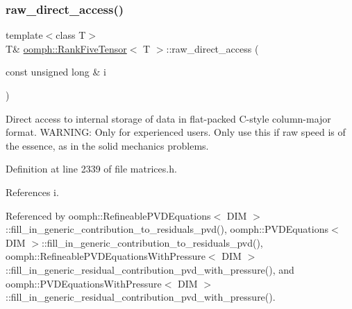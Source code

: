 \subsubsection{\texorpdfstring{raw\+\_\+direct\+\_\+access()}{raw\_direct\_access()}\hspace{0.1cm}{\footnotesize\ttfamily [1/2]}}
{\footnotesize\ttfamily template$<$class T$>$ \\
T\& \hyperlink{classoomph_1_1RankFiveTensor}{oomph\+::\+Rank\+Five\+Tensor}$<$ T $>$\+::raw\+\_\+direct\+\_\+access (\begin{DoxyParamCaption}\item[{const unsigned long \&}]{i }\end{DoxyParamCaption})\hspace{0.3cm}{\ttfamily [inline]}}



Direct access to internal storage of data in flat-\/packed C-\/style column-\/major format. W\+A\+R\+N\+I\+NG\+: Only for experienced users. Only use this if raw speed is of the essence, as in the solid mechanics problems. 



Definition at line 2339 of file matrices.\+h.



References i.



Referenced by oomph\+::\+Refineable\+P\+V\+D\+Equations$<$ D\+I\+M $>$\+::fill\+\_\+in\+\_\+generic\+\_\+contribution\+\_\+to\+\_\+residuals\+\_\+pvd(), oomph\+::\+P\+V\+D\+Equations$<$ D\+I\+M $>$\+::fill\+\_\+in\+\_\+generic\+\_\+contribution\+\_\+to\+\_\+residuals\+\_\+pvd(), oomph\+::\+Refineable\+P\+V\+D\+Equations\+With\+Pressure$<$ D\+I\+M $>$\+::fill\+\_\+in\+\_\+generic\+\_\+residual\+\_\+contribution\+\_\+pvd\+\_\+with\+\_\+pressure(), and oomph\+::\+P\+V\+D\+Equations\+With\+Pressure$<$ D\+I\+M $>$\+::fill\+\_\+in\+\_\+generic\+\_\+residual\+\_\+contribution\+\_\+pvd\+\_\+with\+\_\+pressure().

\mbox{\label{classoomph_1_1RankFiveTensor_a15c5e1c7dee4142962716be02accb1a0}} 
